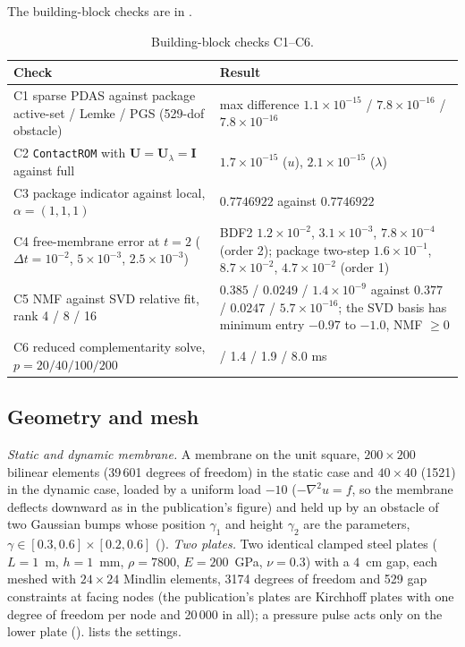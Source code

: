 The building-block checks are in .

\begin{table}[tbp]
\centering\footnotesize
\caption{Building-block checks C1--C6.}\label{tab:vf-bl-checks}
\begin{tabularx}{\linewidth}{@{}>{\raggedright\arraybackslash}p{4.8cm} >{\raggedright\arraybackslash}X@{}}
\toprule
Check & Result\\
\midrule
C1 sparse PDAS against package active-set / Lemke / PGS (529-dof obstacle) & max difference $1.1\times10^{-15}$ / $7.8\times10^{-16}$ / $7.8\times10^{-16}$\\
C2 \texttt{ContactROM} with $\mathbf U=\mathbf U_\lambda=\mathbf I$ against full & $1.7\times10^{-15}$ ($u$), $2.1\times10^{-15}$ ($\lambda$)\\
C3 package indicator against local, $\alpha=(1,1,1)$ & $0.7746922$ against $0.7746922$\\
C4 free-membrane error at $t=2$ ($\Delta t=10^{-2}$, $5\times10^{-3}$, $2.5\times10^{-3}$) & BDF2 $1.2\times10^{-2}$, $3.1\times10^{-3}$, $7.8\times10^{-4}$ (order 2); package two-step $1.6\times10^{-1}$, $8.7\times10^{-2}$, $4.7\times10^{-2}$ (order 1)\\
C5 NMF against SVD relative fit, rank 4 / 8 / 16 & $0.385$ / $0.0249$ / $1.4\times10^{-9}$ against $0.377$ / $0.0247$ / $5.7\times10^{-16}$; the SVD basis has minimum entry $-0.97$ to $-1.0$, NMF $\ge0$\\
C6 reduced complementarity solve, $p=20/40/100/200$ & 1.0 / 1.4 / 1.9 / 8.0 ms\\
\bottomrule
\end{tabularx}
\end{table}

\subsection*{Geometry and mesh}

\emph{Static and dynamic membrane.} A membrane on the unit square, $200\times200$ bilinear elements (39\,601 degrees of freedom) in the static case and $40\times40$ (1521) in the dynamic case, loaded by a uniform load $-10$ ($-\nabla^2u=f$, so the membrane deflects downward as in the publication's figure) and held up by an obstacle of two Gaussian bumps whose position $\gamma_1$ and height $\gamma_2$ are the parameters, $\gamma\in[0.3,0.6]\times[0.2,0.6]$ (). \emph{Two plates.} Two identical clamped steel plates ($L=1$~m, $h=1$~mm, $\rho=7800$, $E=200$~GPa, $\nu=0.3$) with a $4$~cm gap, each meshed with $24\times24$ Mindlin elements, 3174 degrees of freedom and 529 gap constraints at facing nodes (the publication's plates are Kirchhoff plates with one degree of freedom per node and 20\,000 in all); a pressure pulse acts only on the lower plate ().  lists the settings.

